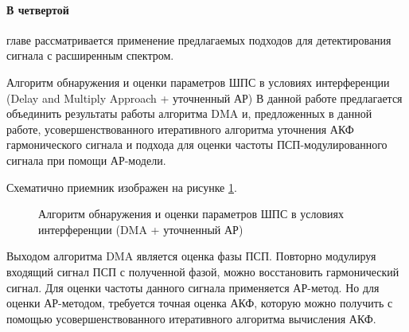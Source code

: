 \paragraph{В четвертой} главе рассматривается применение предлагаемых подходов для детектирования сигнала с расширенным спектром.

Алгоритм обнаружения и оценки параметров ШПС в условиях интерференции (Delay and Multiply Approach + уточненный АР)
В данной работе предлагается объединить результаты работы алгоритма DMA и, предложенных
в данной работе, усовершенствованного итеративного алгоритма уточнения АКФ гармонического
сигнала и подхода для оценки частоты ПСП-модулированного сигнала при помощи АР-модели.

Схематично приемник изображен на рисунке \ref{pic:ar_dma_scheme}.

\begin{figure}[H]
\center{}
	\caption{Алгоритм обнаружения и оценки параметров ШПС в условиях интерференции (DMA + уточненный АР)}
	\label{pic:ar_dma_scheme}
\end{figure}

Выходом алгоритма DMA является оценка фазы ПСП. Повторно модулируя входящий сигнал ПСП с полученной
фазой, можно восстановить гармонический сигнал. Для оценки частоты данного сигнала применяется
АР-метод. Но для оценки АР-методом, требуется точная оценка АКФ, которую можно получить
с помощью усовершенствованного итеративного алгоритма вычисления АКФ.

